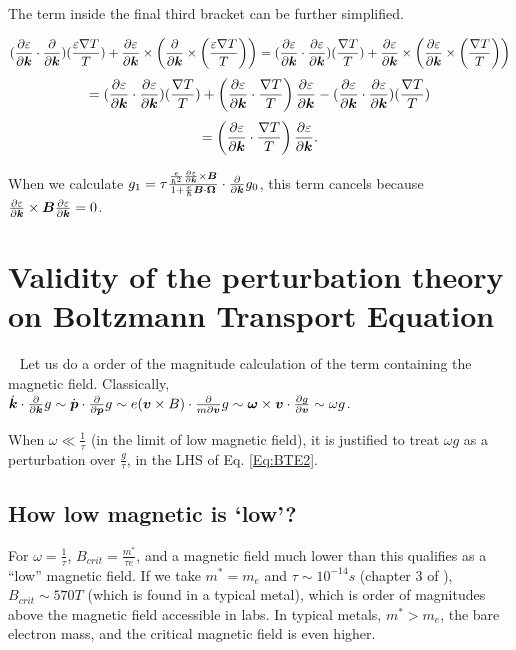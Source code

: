 \documentclass{report}
\renewcommand\vec[1]{\ensuremath\boldsymbol{#1}} %
\begin{document}
The term inside the final third bracket can be further simplified.

$$ (\frac{\partial \varepsilon}{\partial \vec{k}} \cdot \frac{\partial }{\partial \vec{k}}) (\frac{\varepsilon \nabla T}{T}) + \frac{\partial \varepsilon}{\partial \vec{k}} \times \left(  \frac{\partial }{\partial \vec{k}} \times \left(\frac{\varepsilon \nabla T}{T}\right) \right) = (\frac{\partial \varepsilon}{\partial \vec{k}} \cdot \frac{\partial \varepsilon}{\partial \vec{k}}) (\frac{ \nabla T}{T}) + \frac{\partial \varepsilon}{\partial \vec{k}} \times \left(  \frac{\partial \varepsilon}{\partial \vec{k}} \times \left(\frac{\nabla T}{T}\right) \right)$$
$$  =(\frac{\partial \varepsilon}{\partial \vec{k}} \cdot \frac{\partial \varepsilon}{\partial \vec{k}}) (\frac{ \nabla T}{T}) + \left(  \frac{\partial \varepsilon}{\partial \vec{k}} \cdot \frac{\nabla T}{T}\right) \frac{\partial \varepsilon}{\partial \vec{k}} -  (\frac{\partial \varepsilon}{\partial \vec{k}} \cdot \frac{\partial \varepsilon}{\partial \vec{k}}) (\frac{ \nabla T}{T})$$
$$= \left(  \frac{\partial \varepsilon}{\partial \vec{k}} \cdot \frac{\nabla T}{T}\right) \frac{\partial \varepsilon}{\partial \vec{k}}.$$

When we calculate $g_1 = \tau \frac{\frac{e}{\hbar^2} \frac{\partial \varepsilon}{\partial \vec{k}} \times \vec{B}}{1 + \frac{e}{\hbar} \vec{B}\cdot\vec{\Omega}} \cdot\frac{\partial}{\partial \vec{k}} g_0$, this term cancels because $\frac{\partial \varepsilon}{\partial \vec{k}} \times \vec{B}  \frac{\partial \varepsilon}{\partial \vec{k}} = 0$.
\chapter{Validity of the perturbation theory on Boltzmann Transport Equation}~\label{app:perturbation_validation}
Let us do a order of the magnitude calculation of the term containing the magnetic field. Classically, $\dot{\vec{k}}\cdot\frac{\partial}{\partial \vec{k}} g \sim \dot{\vec{p}}\cdot\frac{\partial}{\partial \vec{p}} g \sim e (\vec{v}\times{B})\cdot\frac{\partial}{m\partial \vec{v}} g \sim \vec{\omega} \times \vec{v}\cdot \frac{\partial g}{\partial \vec{v}} \sim \omega g$.

When $\omega \ll \frac{1}{\tau}$ (in the limit of low magnetic field), it is justified to treat $\omega g$ as a perturbation over $\frac{g}{\tau}$, in the LHS of Eq. \eqref{Eq:BTE2}.
\section{How low magnetic is `low'?}
For $\omega = \frac{1}{\tau}$, $B_{crit} = \frac{m^*}{\tau e}$, and a magnetic field much lower than this qualifies as a ``low'' magnetic field. If we take $m^* = m_e$ and $\tau \sim 10^{-14} s$ (chapter 3 of \cite{book:SimonSolidState}), $B_{crit} \sim 570 T$ (which is found in a typical metal), which is order of magnitudes above the magnetic field accessible in labs. In typical metals, $m^* > m_e$, the bare electron mass, and the critical magnetic field is even higher.
\end{document}
